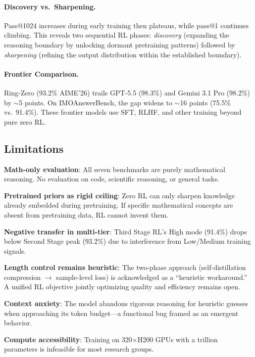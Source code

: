 \documentclass[11pt,a4paper]{article}
\begin{document}
\paragraph{Discovery vs.\ Sharpening.} Pass@1024 increases during early training then plateaus, while pass@1 continues climbing. This reveals two sequential RL phases: \emph{discovery} (expanding the reasoning boundary by unlocking dormant pretraining patterns) followed by \emph{sharpening} (refining the output distribution within the established boundary).

\paragraph{Frontier Comparison.} Ring-Zero (93.2\% AIME'26) trails GPT-5.5 (98.3\%) and Gemini 3.1 Pro (98.2\%) by ${\sim}$5 points. On IMOAnswerBench, the gap widens to ${\sim}$16 points (75.5\% vs.\ 91.4\%). These frontier models use SFT, RLHF, and other training beyond pure zero RL.

\subsection{Limitations}

\textbf{Math-only evaluation}: All seven benchmarks are purely mathematical reasoning. No evaluation on code, scientific reasoning, or general tasks.

\textbf{Pretrained priors as rigid ceiling}: Zero RL can only sharpen knowledge already embedded during pretraining. If specific mathematical concepts are absent from pretraining data, RL cannot invent them.

\textbf{Negative transfer in multi-tier}: Third Stage RL's High mode (91.4\%) drops below Second Stage peak (93.2\%) due to interference from Low/Medium training signals.

\textbf{Length control remains heuristic}: The two-phase approach (self-distillation compression $\to$ sample-level loss) is acknowledged as a ``heuristic workaround.'' A unified RL objective jointly optimizing quality and efficiency remains open.

\textbf{Context anxiety}: The model abandons rigorous reasoning for heuristic guesses when approaching its token budget---a functional bug framed as an emergent behavior.

\textbf{Compute accessibility}: Training on 320$\times$H200 GPUs with a trillion parameters is infeasible for most research groups.
\end{document}
